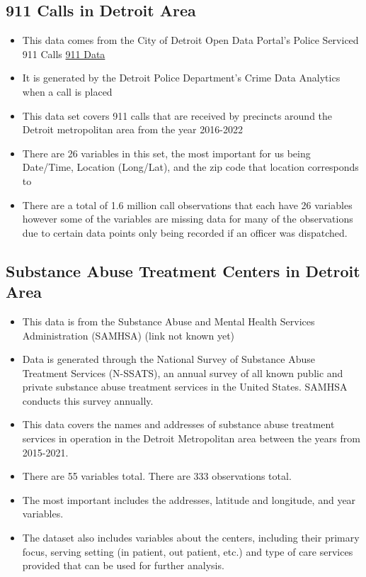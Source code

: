 \documentclass[12pt]{article}
\begin{document}
\subsection{911 Calls in Detroit Area}
\begin{itemize}
  \item This data comes from the City of Detroit Open Data Portal's Police Serviced 911 Calls  \href{https://data.detroitmi.gov/datasets/detroitmi::police-serviced-911-calls/about}{911 Data}
  \item It is generated by the Detroit Police Department's Crime Data Analytics  when a call is placed
  \item This data set covers 911 calls that are received by precincts around the Detroit metropolitan area from the year 2016-2022
  \item There are 26 variables in this set, the most important for us being Date/Time, Location (Long/Lat), and the zip code that location corresponds to
  \item There are a total of 1.6 million call observations that each have 26 variables however some of the variables are missing data for many of the observations due to certain data points only being recorded if an officer was dispatched.
\end{itemize}

\subsection{Substance Abuse Treatment Centers in Detroit Area}
    \begin{itemize}
        \item This data is from the Substance Abuse and Mental Health Services Administration (SAMHSA) (link not known yet)
  \item Data is generated through the National Survey of Substance Abuse Treatment Services (N-SSATS), an annual survey of all known public and private substance abuse treatment services in the United States. SAMHSA conducts this survey annually.
  \item This data covers the names and addresses of substance abuse treatment services in operation in the Detroit Metropolitan area between the years from 2015-2021. 
  \item There are 55 variables total. There are 333 observations total. 
  \item The most important includes the addresses, latitude and longitude, and year variables. 
  \item   The dataset also includes variables about the centers, including their primary focus, serving setting (in patient, out patient, etc.) and type of care services provided that can be used for further analysis.
  \end{itemize}
\end{document}

